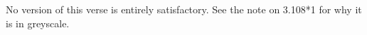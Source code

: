 \begin{ekdosis}


\begin{philcomm}[hp03_108_2]
No version of this verse is entirely satisfactory. See the note on 3.108*1 for why it is in greyscale.
\end{philcomm}

\end{ekdosis}

